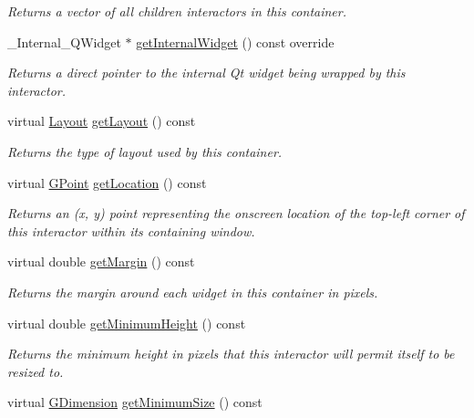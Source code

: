 \begin{DoxyCompactItemize}
\begin{DoxyCompactList}\small\item\em Returns a vector of all children interactors in this container. \end{DoxyCompactList}\item 
\+\_\+\+Internal\+\_\+\+Q\+Widget $\ast$ \mbox{\hyperlink{classGContainer_a2f6b36b2517087dc90a366b5ce1f5323}{get\+Internal\+Widget}} () const override
\begin{DoxyCompactList}\small\item\em Returns a direct pointer to the internal Qt widget being wrapped by this interactor. \end{DoxyCompactList}\item 
virtual \mbox{\hyperlink{classGContainer_a1b7da28ed84c0763e8f92cde2df4799b}{Layout}} \mbox{\hyperlink{classGContainer_aeebcf77b7fdc91a1ba0371cc9b91d5e2}{get\+Layout}} () const
\begin{DoxyCompactList}\small\item\em Returns the type of layout used by this container. \end{DoxyCompactList}\item 
virtual \mbox{\hyperlink{structGPoint}{G\+Point}} \mbox{\hyperlink{classGInteractor_a4f83802015511edeb63b892830812c11}{get\+Location}} () const
\begin{DoxyCompactList}\small\item\em Returns an (x, y) point representing the onscreen location of the top-\/left corner of this interactor within its containing window. \end{DoxyCompactList}\item 
virtual double \mbox{\hyperlink{classGContainer_ae2b63e249b9251e1893dae87aaf4cc3d}{get\+Margin}} () const
\begin{DoxyCompactList}\small\item\em Returns the margin around each widget in this container in pixels. \end{DoxyCompactList}\item 
virtual double \mbox{\hyperlink{classGInteractor_aed4b0075fcc434499c3cb3e46896bda3}{get\+Minimum\+Height}} () const
\begin{DoxyCompactList}\small\item\em Returns the minimum height in pixels that this interactor will permit itself to be resized to. \end{DoxyCompactList}\item 
virtual \mbox{\hyperlink{structGDimension}{G\+Dimension}} \mbox{\hyperlink{classGInteractor_a66b5af0b32493b4d597ca0a3df2049ea}{get\+Minimum\+Size}} () const

\end{DoxyCompactItemize}
